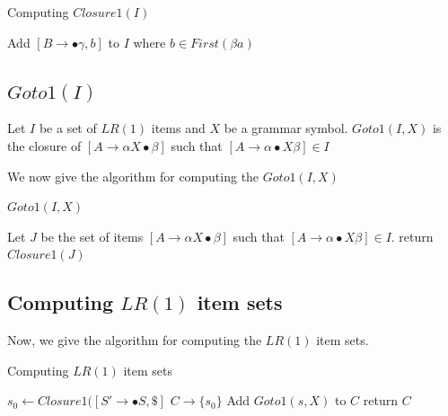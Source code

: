 \documentclass[oneside]{book}
\begin{document}
\begin{algorithm}
\caption{Computing $Closure1(I)$}
\begin{algorithmic}
\REPEAT
{}
\STATE Add $[B \rightarrow \bullet \gamma, b]$ to $I$ where $b \in First(\beta a)$
\ENDIF
{}
\end{algorithmic}
\end{algorithm}

\subsection{$Goto1(I)$}
Let $I$ be a set of $LR(1)$ items and $X$ be a grammar symbol. $Goto1(I,X)$ is the closure of $[A \rightarrow \alpha X \bullet \beta]$ such that $[A \rightarrow \alpha\bullet X  \beta] \in I$

We now give the algorithm for computing the $Goto1(I,X)$

\begin{algorithm}
\caption{$Goto1(I,X)$}
\begin{algorithmic}
\STATE Let $J$ be the set of items $[A \rightarrow \alpha X \bullet \beta]$ such that $[A \rightarrow \alpha\bullet X  \beta] \in I$.
\STATE return $Closure1(J)$
\end{algorithmic}
\end{algorithm}

\subsection{Computing $LR(1)$ item sets}
Now, we give the algorithm for computing the $LR(1)$ item sets.

\begin{algorithm}
\caption{Computing $LR(1)$ item sets}
\begin{algorithmic}
\STATE $s_0 \leftarrow Closure1([S' \rightarrow \bullet S, \$]$
\STATE $C \rightarrow \{s_0\}$
\REPEAT
{}
\STATE Add $Goto1(s,X)$ to $C$
\ENDIF 
\ENDFOR
\ENDFOR 
{}
\STATE return $C$ 
\end{algorithmic}
\end{algorithm}  
\end{document}
